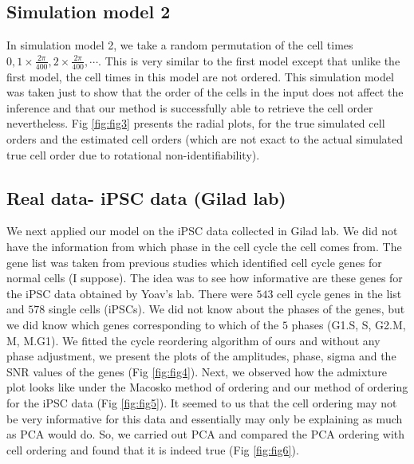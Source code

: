 \documentclass[11pt]{article}
\begin{document}
\subsection{Simulation model 2}

In simulation model 2, we take a random permutation of the cell times $0, 1 \times \frac{2 \pi}{400}, 2 \times \frac{2 \pi}{400}, \cdots $. This is very similar to the first model except that unlike the first model, the cell times in this model are not ordered. This simulation model was taken just to show that the order of the cells in the input does not affect the inference and that our method is successfully able to retrieve the cell order nevertheless. Fig \ref{fig:fig3} presents the radial plots, for the true simulated cell orders and the estimated cell orders (which are not exact to the actual simulated true cell order due to rotational non-identifiability).

\subsection{Real data- iPSC data (Gilad lab)}

We next applied our model on the iPSC data collected in Gilad lab. We did not have the information from which phase in the cell cycle the cell comes from. The gene list was taken from previous studies which identified cell cycle genes for normal cells (I suppose). The idea was to see how informative are these genes for the iPSC data obtained by Yoav's lab. There were $543$ cell cycle genes in the list and $578$ single cells (iPSCs).  We did not know about the phases of the genes, but we did know which genes corresponding to which of the $5$ phases (G1.S, S, G2.M, M, M.G1).  We fitted the cycle reordering algorithm of ours and without any phase adjustment, we present the plots of the amplitudes, phase, sigma and the SNR values of the genes (Fig \ref{fig:fig4}). Next, we observed how the admixture plot looks like under the Macosko method of ordering and our method of ordering for the iPSC data (Fig \ref{fig:fig5}).  It seemed to us that the cell ordering may not be very informative for this data and essentially may only be explaining as much as PCA would do. So, we carried out PCA and compared the PCA ordering with cell ordering and found that it is indeed true (Fig \ref{fig:fig6}).
\end{document}
